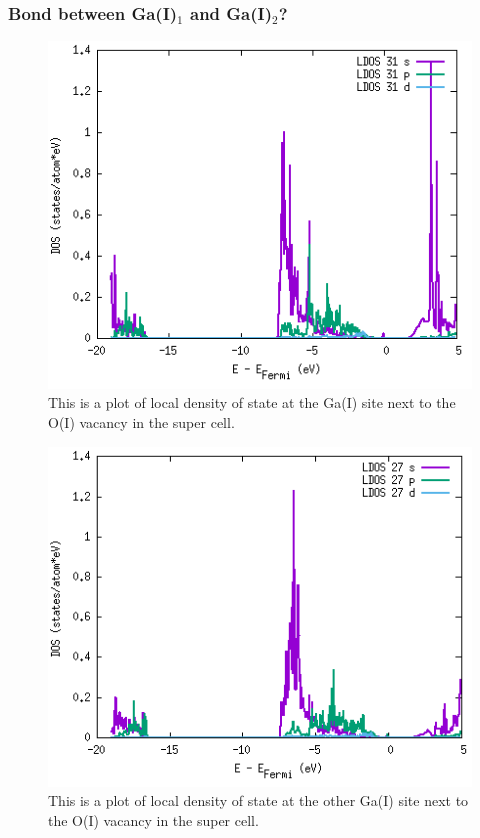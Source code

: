 \subsubsection{Bond between Ga(I)$_1$ and Ga(I)$_2$?}

\begin{figure}[H]
\includegraphics[width=\linewidth]{../fig/dosplot/ldos_Ga_I_OI_vac_nabo}\caption{This is a plot of local density of state at the Ga(I) site next to the O(I) vacancy in the super cell.}\label{fig:ldos_Ga_I_nabo}
\end{figure}

\begin{figure}[H]
\includegraphics[width=\linewidth]{../fig/dosplot/ldos_Ga_I_OI_vac_nabo2}\caption{This is a plot of local density of state at the other Ga(I) site next to the O(I) vacancy in the super cell.}\label{fig:ldos_Ga_I_nabo}
\end{figure}

